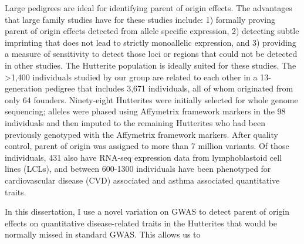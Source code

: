 Large pedigrees are ideal for identifying parent of origin effects\cite{Baran:2015cx}. The advantages that large family studies have for these studies include: 1) formally proving parent of origin effects detected from allele specific expression, 2) detecting subtle imprinting that does not lead to strictly monoallelic expression, and 3) providing a measure of sensitivity to detect those loci or regions that could not be detected in other studies.\cite{Baran:2015cx} The Hutterite population is ideally suited for these studies. The >1,400 individuals studied by our group are related to each other in a 13-generation pedigree that includes 3,671 individuals, all of whom originated from only 64 founders. Ninety-eight Hutterites were initially selected for whole genome sequencing; alleles were phased using Affymetrix framework markers in the 98 individuals and then imputed to the remaining Hutterites who had been previously genotyped with the Affymetrix framework markers\cite{Livne2015}. After quality control, parent of origin was assigned to more than 7 million variants. Of those individuals, 431 also have RNA-seq expression data from lymphoblastoid cell lines (LCLs), and between 600-1300 individuals have been phenotyped for cardiovascular disease (CVD) associated  and asthma associated quantitative traits.


In this dissertation, I use a novel variation on GWAS to detect parent of origin effects on quantitative disease-related traits in the Hutterites that would be normally missed in standard GWAS. This allows us to 


